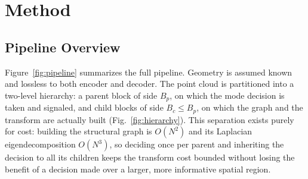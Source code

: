 \documentclass[conference]{IEEEtran}
\begin{document}
\begin{table}[t]
\centering
\caption{Attribute-compression methods compared on four axes.}
\label{tab:related}
\end{table}

\section{Method}

\subsection{Pipeline Overview}
Figure~\ref{fig:pipeline} summarizes the full pipeline. Geometry is assumed known and lossless
to both encoder and decoder. The point cloud is partitioned into a two-level hierarchy: a parent
block of side $B_p$, on which the mode decision is taken and signaled, and child blocks of side
$B_c \le B_p$, on which the graph and the transform are actually built
(Fig.~\ref{fig:hierarchy}). This separation exists purely for cost: building the structural
graph is $O(N^2)$ and its Laplacian eigendecomposition $O(N^3)$, so deciding once per parent and
inheriting the decision to all its children keeps the transform cost bounded without losing the
benefit of a decision made over a larger, more informative spatial region.
\end{document}
